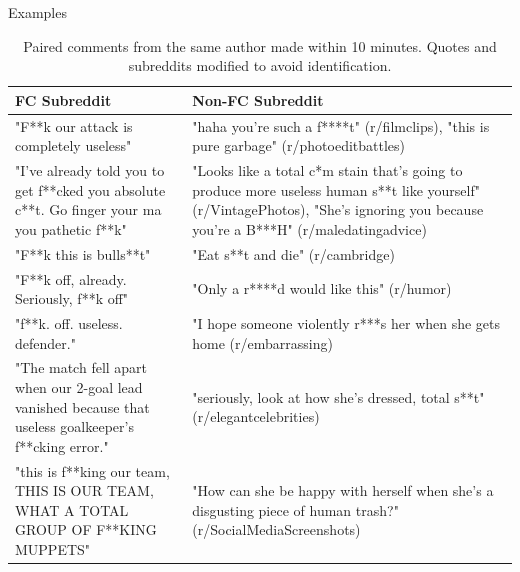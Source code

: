 \documentclass[10pt]{beamer}
\begin{document}
\begin{frame}{Examples}

{\footnotesize
\begin{table}[htbp] %
  \centering
  \begin{tabular}{p{.45\linewidth} p{.5\linewidth}}
    \hline
    \textbf{FC Subreddit} & \textbf{Non-FC Subreddit} \\
    \hline
    "F**k our attack is completely useless" & 
    "haha you're such a f****t" (r/filmclips), "this is pure garbage" (r/photoeditbattles) \\
    "I've already told you to get f**cked you absolute c**t. Go finger your ma you pathetic f**k" & 
    "Looks like a total c*m stain that's going to produce more useless human s**t like yourself" (r/VintagePhotos), "She's ignoring you because you're a B***H" (r/maledatingadvice) \\
    "F**k this is bulls**t" & "Eat s**t and die" (r/cambridge) \\
    "F**k off, already. Seriously, f**k off" & "Only a r****d would like this" (r/humor) \\
    "f**k. off. useless. defender." & "I hope someone violently r***s her when she gets home (r/embarrassing) \\
    "The match fell apart when our 2-goal lead vanished because that useless goalkeeper's f**cking error." & "seriously, look at how she's dressed, total s**t" (r/elegantcelebrities) \\
    "this is f**king our team, THIS IS OUR TEAM, WHAT A TOTAL GROUP OF F**KING MUPPETS" & "How can she be happy with herself when she's a disgusting piece of human trash?" (r/SocialMediaScreenshots) \\
    \hline
  \end{tabular}
  \caption{Paired comments from the same author made within 10 minutes. Quotes and subreddits modified to avoid identification.}
  \label{tab:bad_pairs}
\end{table} %
}
\end{frame}
\end{document}
